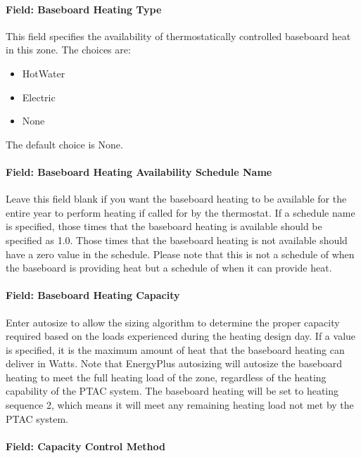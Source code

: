 \paragraph{Field: Baseboard Heating Type}\label{field-baseboard-heating-type-2}

This field specifies the availability of thermostatically controlled baseboard heat in this zone. The choices are:

\begin{itemize}
\item
  HotWater
\item
  Electric
\item
  None
\end{itemize}

The default choice is None.

\paragraph{Field: Baseboard Heating Availability Schedule Name}\label{field-baseboard-heating-availability-schedule-name-2}

Leave this field blank if you want the baseboard heating to be available for the entire year to perform heating if called for by the thermostat. If a schedule name is specified, those times that the baseboard heating is available should be specified as 1.0. Those times that the baseboard heating is not available should have a zero value in the schedule. Please note that this is not a schedule of when the baseboard is providing heat but a schedule of when it can provide heat.

\paragraph{Field: Baseboard Heating Capacity}\label{field-baseboard-heating-capacity-2}

Enter autosize to allow the sizing algorithm to determine the proper capacity required based on the loads experienced during the heating design day. If a value is specified, it is the maximum amount of heat that the baseboard heating can deliver in Watts. Note that EnergyPlus autosizing will autosize the baseboard heating to meet the full heating load of the zone, regardless of the heating capability of the PTAC system. The baseboard heating will be set to heating sequence 2, which means it will meet any remaining heating load not met by the PTAC system.

\paragraph{Field: Capacity Control Method}

